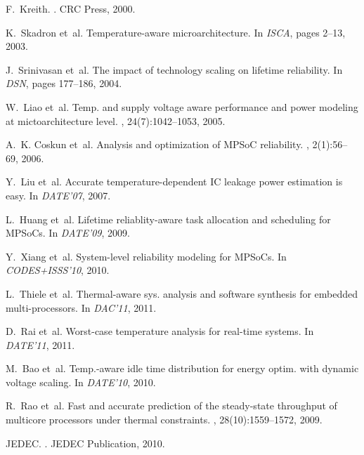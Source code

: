 \begin{thebibliography}{10}
\small

F.~Kreith.
.
\newblock CRC Press, 2000.

K.~Skadron et~al.
\newblock Temperature-aware microarchitecture.
\newblock In {\em ISCA}, pages 2--13, 2003.

J.~Srinivasan et~al.
\newblock The impact of technology scaling on lifetime reliability.
\newblock In {\em DSN}, pages 177--186, 2004.

W.~Liao et~al.
\newblock Temp. and supply voltage aware performance and power modeling at
  mictoarchitecture level.
, 24(7):1042--1053, 2005.

A.~K. Coskun et~al.
\newblock Analysis and optimization of {MPSoC} reliability.
, 2(1):56--69, 2006.

Y.~Liu et~al.
\newblock Accurate temperature-dependent {IC} leakage power estimation is easy.
\newblock In {\em DATE'07}, 2007.

L.~Huang et~al.
\newblock Lifetime reliablity-aware task allocation and scheduling for
  {MPSoCs}.
\newblock In {\em DATE'09}, 2009.

Y.~Xiang et~al.
\newblock System-level reliability modeling for {MPSoCs}.
\newblock In {\em CODES+ISSS'10}, 2010.

L.~Thiele et~al.
\newblock Thermal-aware sys. analysis and software synthesis for embedded
  multi-processors.
\newblock In {\em DAC'11}, 2011.

D.~Rai et~al.
\newblock Worst-case temperature analysis for real-time systems.
\newblock In {\em DATE'11}, 2011.

M.~Bao et~al.
\newblock Temp.-aware idle time distribution for energy optim. with dynamic
  voltage scaling.
\newblock In {\em DATE'10}, 2010.

R.~Rao et~al.
\newblock Fast and accurate prediction of the steady-state throughput of
  multicore processors under thermal constraints.
, 28(10):1559--1572, 2009.

JEDEC.
.
\newblock JEDEC Publication, 2010.


\end{thebibliography}

